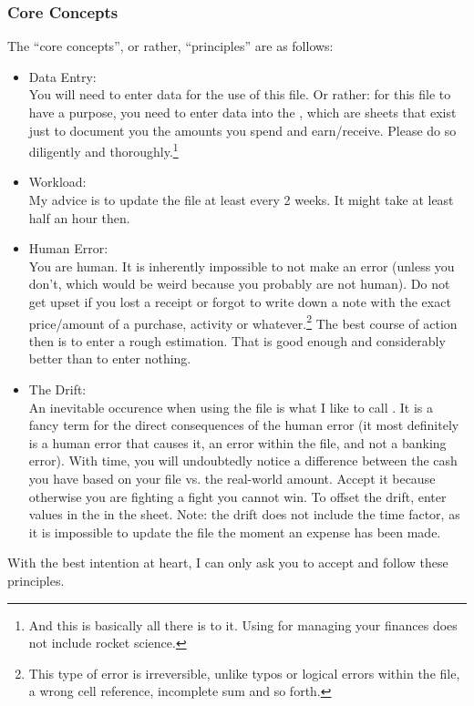 \subsubsection{Core Concepts}
\label{subsubsec:core-concepts}

The ``core concepts'', or rather, ``principles'' are as follows:
\begin{itemize}
	\item Data Entry:\\
	You will need to enter data for the use of this file.
	Or rather: for this file to have a purpose, you need to enter data into the , which are sheets that exist just to document you the amounts you spend and earn/receive.
	Please do so diligently and thoroughly.\footnote{And this is basically all there is to it.
	Using \tfn for managing your finances does not include rocket science.}
	\item Workload:\\
	My advice is to update the file at least every 2 weeks.
	It might take at least half an hour then.
	\item Human Error:\\
	You are human.
	It is inherently impossible to not make an error (unless you don't, which would be weird because you probably are not human).
	Do not get upset if you lost a receipt or forgot to write down a note with the exact price/amount of a purchase, activity or whatever.\footnote{This type of error is irreversible, unlike typos or logical errors within the file, \eg a wrong cell reference, incomplete sum and so forth.}
	The best course of action then is to enter a rough estimation.
	That is good enough and considerably better than to enter nothing.
	\item The Drift:\\
	An inevitable occurence when using the file is what I like to call .
	It is a fancy term for the direct consequences of the human error (it most definitely is a human error that causes it, \ie an error within the file, and not a banking error).
	With time, you will undoubtedly notice a difference between the cash you have based on your file vs. the real-world amount.
	Accept it because otherwise you are fighting a fight you cannot win.
	To offset the drift, enter values in the  in the  sheet.
	Note: the drift does not include the time factor, as it is impossible to update the file the moment an expense has been made.
\end{itemize}
With the best intention at heart, I can only ask you to accept and follow these principles.

